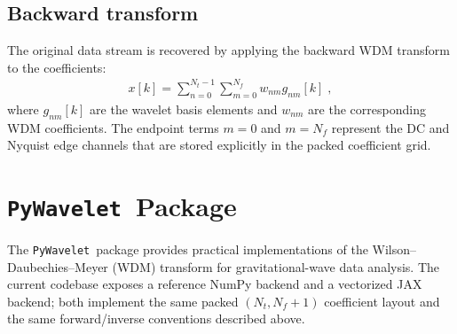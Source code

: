 \documentclass[%
 reprint,
superscriptaddress,
nofootinbib,
 amsmath,amssymb,
 aps,
colorlinks = true, 
linkcolor = blue, 
urlcolor = blue, 
citecolor = blue, 
anchorcolor = blue,
]{revtex4-2}
\newcommand{\package}{\texttt{PyWavelet}}
\begin{document}
%

\subsection{Backward transform}

The original data stream is recovered by applying the backward WDM transform to the coefficients:
\begin{align}
\label{eq:inverse_wavelet_decomposition}
x[k]=\sum_{n=0}^{N_t-1}\sum_{m=0}^{N_f}w_{nm}g_{nm}[k]\;,
\end{align}
where $g_{nm}[k]$ are the wavelet basis elements and $w_{nm}$ are the corresponding WDM coefficients. The endpoint terms $m=0$ and $m=N_f$ represent the DC and Nyquist edge channels that are stored explicitly in the packed coefficient grid.



\section{\package\ Package}

\label{sec:code_package}

The \package\ package provides practical implementations of the Wilson–Daubechies–Meyer (WDM) transform for gravitational-wave data analysis. The current codebase exposes a reference NumPy backend and a vectorized JAX backend; both implement the same packed $(N_t, N_f + 1)$ coefficient layout and the same forward/inverse conventions described above.
\end{document}
